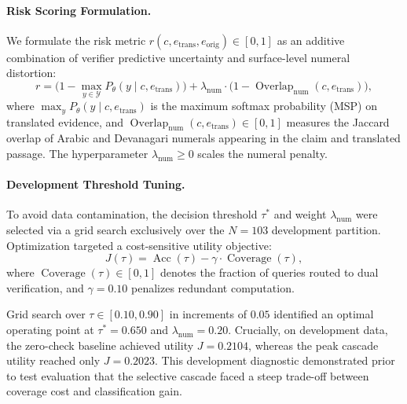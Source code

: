 \paragraph{Risk Scoring Formulation.}
We formulate the risk metric $r(c, e_{\text{trans}}, e_{\text{orig}}) \in [0, 1]$ as an additive combination of verifier predictive uncertainty and surface-level numeral distortion:
\begin{equation}
    r = \big(1 - \max_{y \in \mathcal{Y}} P_\theta(y \mid c, e_{\text{trans}})\big) + \lambda_{\text{num}} \cdot \big(1 - \operatorname{Overlap}_{\text{num}}(c, e_{\text{trans}})\big),
    \label{eq:risk_score}
\end{equation}
where $\max_y P_\theta(y \mid c, e_{\text{trans}})$ is the maximum softmax probability (MSP) on translated evidence, and $\operatorname{Overlap}_{\text{num}}(c, e_{\text{trans}}) \in [0, 1]$ measures the Jaccard overlap of Arabic and Devanagari numerals appearing in the claim and translated passage. The hyperparameter $\lambda_{\text{num}} \ge 0$ scales the numeral penalty.

\paragraph{Development Threshold Tuning.}
To avoid data contamination, the decision threshold $\tau^*$ and weight $\lambda_{\text{num}}$ were selected via a grid search exclusively over the $N=103$ development partition. Optimization targeted a cost-sensitive utility objective:
\begin{equation}
    J(\tau) = \operatorname{Acc}(\tau) - \gamma \cdot \operatorname{Coverage}(\tau),
\end{equation}
where $\operatorname{Coverage}(\tau) \in [0, 1]$ denotes the fraction of queries routed to dual verification, and $\gamma = 0.10$ penalizes redundant computation. 

Grid search over $\tau \in [0.10, 0.90]$ in increments of $0.05$ identified an optimal operating point at $\tau^* = 0.650$ and $\lambda_{\text{num}} = 0.20$. Crucially, on development data, the zero-check baseline achieved utility $J = 0.2104$, whereas the peak cascade utility reached only $J = 0.2023$. This development diagnostic demonstrated prior to test evaluation that the selective cascade faced a steep trade-off between coverage cost and classification gain.
